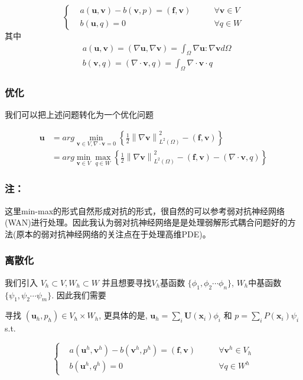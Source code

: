 $$\left\{
    \begin{aligned}
        &a(\textbf{u},\textbf{v})-b(\textbf{v}, p)=(\textbf{f}, \textbf{v}) \qquad &\forall \textbf{v}\in V\\
        &b(\textbf{u}, q)=0 \qquad &\forall q\in W
    \end{aligned}
\right.$$
其中 $$\begin{aligned}
    &a(\textbf{u},\textbf{v})=(\nabla \textbf{u},\nabla \textbf{v})=\int_\Omega \nabla \textbf{u}:\nabla \textbf{v}d\Omega\\
    &b(\textbf{v}, q)=(\nabla\cdot \textbf{v}, q)=\int_\Omega \nabla\cdot \textbf{v}\cdot q
\end{aligned}$$

\subsubsection{优化}
我们可以把上述问题转化为一个优化问题

\begin{tcolorbox}
    $$\begin{aligned}
    \textbf{u}&=arg \min_{\textbf{v}\in V, \nabla \cdot \textbf{v}=0}\left\{\frac{1}{2}\left\|\nabla \textbf{v}\right\|^2_{L^2(\Omega)}-(\textbf{f}, \textbf{v})\right\}\\
    &=arg \min_{\textbf{v}\in V} \max_{q\in W}\left\{\frac{1}{2}\left\|\nabla \textbf{v}\right\|^2_{L^2(\Omega)}-(\textbf{f}, \textbf{v}) -(\nabla \cdot \textbf{v}, q)\right\}
\end{aligned}$$
\end{tcolorbox}


\subsubsection*{注：}
这里min-max的形式自然形成对抗的形式，很自然的可以参考弱对抗神经网络(WAN)进行处理。因此我认为弱对抗神经网络是是处理弱解形式耦合问题好的方法(原本的弱对抗神经网络的关注点在于处理高维PDE)。

\subsubsection{离散化}

我们引入 $V_h\subset V, W_h\subset W$ 并且想要寻找$V_h$基函数 $\{\phi_1,\phi_2\cdots \phi_n\}$,  $W_h$中基函数$\{\psi_1, \psi_2\cdots \psi_m\}$. 
因此我们需要
\begin{tcolorbox}
    寻找 $(\textbf{u}_h, p_h)\in V_h\times W_h$, 更具体的是, $\textbf{u}_h=\sum_i\textbf{U}(\textbf{x}_i)\phi_i$ 和 $p=\sum_iP(\textbf{x}_i)\psi_i$ s.t. 

$$\left\{
\begin{aligned}
    &a(\textbf{u}^h, \textbf{v}^h)-b(\textbf{v}^h,p^h)=(\textbf{f}, \textbf{v}) \qquad &\forall \textbf{v}^h\in V_h\\
    &b(\textbf{u}^h, q^h)=0\qquad &\forall q\in W^h
\end{aligned}
\right.$$
\end{tcolorbox}


